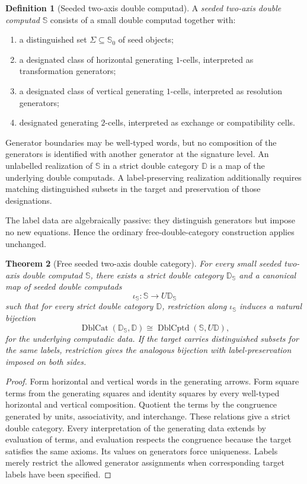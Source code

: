 \documentclass[11pt]{article}
\newtheorem{theorem}{Theorem}[section]
\theoremstyle{definition}
\newtheorem{definition}[theorem]{Definition}
\theoremstyle{remark}
\newcommand{\Seeds}{\Sigma}
\begin{document}
\begin{definition}[Seeded two-axis double computad]\label{def:twoaxis-computad}
A \emph{seeded two-axis double computad} $\mathbb S$ consists of a small double computad together with:
\begin{enumerate}
    \item a distinguished set $\Seeds\subseteq \mathbb S_0$ of seed objects;
    \item a designated class of horizontal generating $1$-cells, interpreted as transformation generators;
    \item a designated class of vertical generating $1$-cells, interpreted as resolution generators;
    \item designated generating $2$-cells, interpreted as exchange or compatibility cells.
\end{enumerate}
Generator boundaries may be well-typed words, but no composition of the generators is identified with another generator at the signature level. An unlabelled realization of $\mathbb S$ in a strict double category $\mathbb D$ is a map of the underlying double computads. A label-preserving realization additionally requires matching distinguished subsets in the target and preservation of those designations.
\end{definition}

The label data are algebraically passive: they distinguish generators but impose no new equations. Hence the ordinary free-double-category construction applies unchanged.

\begin{theorem}[Free seeded two-axis double category]\label{thm:free-double}
For every small seeded two-axis double computad $\mathbb S$, there exists a strict double category $\mathbb D_{\mathbb S}$ and a canonical map of seeded double computads
\[
\iota_{\mathbb S}:\mathbb S\longrightarrow U\mathbb D_{\mathbb S}
\]
such that for every strict double category $\mathbb D$, restriction along $\iota_{\mathbb S}$ induces a natural bijection
\[
\operatorname{DblCat}(\mathbb D_{\mathbb S},\mathbb D)
\cong
\operatorname{DblCptd}(\mathbb S,U\mathbb D),
\]
for the underlying computadic data. If the target carries distinguished subsets for the same labels, restriction gives the analogous bijection with label-preservation imposed on both sides.
\end{theorem}

\begin{proof}
Form horizontal and vertical words in the generating arrows. Form square terms from the generating squares and identity squares by every well-typed horizontal and vertical composition. Quotient the terms by the congruence generated by units, associativity, and interchange. These relations give a strict double category. Every interpretation of the generating data extends by evaluation of terms, and evaluation respects the congruence because the target satisfies the same axioms. Its values on generators force uniqueness. Labels merely restrict the allowed generator assignments when corresponding target labels have been specified.
\end{proof}
\end{document}
